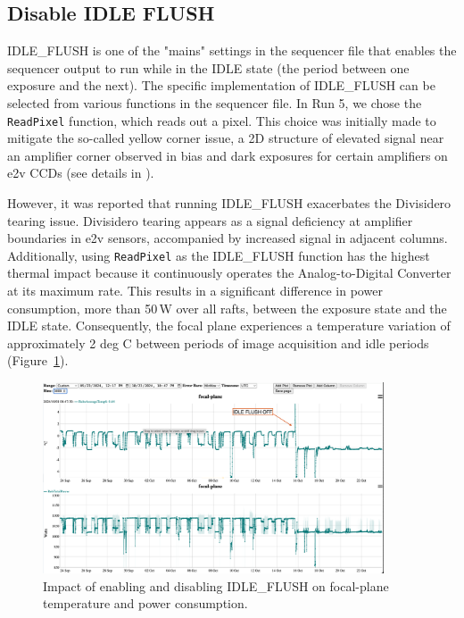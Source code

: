 \subsection{Disable IDLE FLUSH}\label{section:disablingIDLEFLUSH}

IDLE\_FLUSH is one of the "mains" settings in the sequencer file that enables the sequencer output to run while in the IDLE state (the period between one exposure and the next). The specific implementation of IDLE\_FLUSH can be selected from various functions in the sequencer file. In Run 5, we chose the \texttt{ReadPixel} function, which reads out a pixel. This choice was initially made to mitigate the so-called yellow corner issue, a 2D structure of elevated signal near an amplifier corner observed in bias and dark exposures for certain amplifiers on e2v CCDs (see details in \citet{2024SPIE13103E..0WU}).

However, it was reported that running IDLE\_FLUSH exacerbates the Divisidero tearing issue. Divisidero tearing appears as a signal deficiency at amplifier boundaries in e2v sensors, accompanied by increased signal in adjacent columns. Additionally, using \texttt{ReadPixel} as the IDLE\_FLUSH function has the highest thermal impact because it continuously operates the Analog-to-Digital Converter at its maximum rate. This results in a significant difference in power consumption, more than 50\,W over all rafts, between the exposure state and the IDLE state. Consequently, the focal plane experiences a temperature variation of approximately 2 deg C between periods of image acquisition and idle periods (Figure~\ref{fig:IdleFlushEffect}).

\begin{figure}
\begin{centering}
\includegraphics[width=0.9\textwidth]{figures/REB_power_temp6_sept24_to_Oct23.png}
\end{centering}
\caption{Impact of enabling and disabling IDLE\_FLUSH on focal-plane temperature and power consumption.}\label{fig:IdleFlushEffect}
\end{figure}

